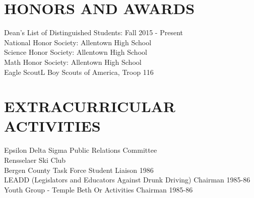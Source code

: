 \documentclass{res}
\begin{document}
\begin{resume}
 
 
\section{HONORS AND AWARDS}          
    Dean's List of Distinguished Students: Fall 2015 - Present  \\        
    National Honor Society: Allentown High School  \\        
    Science Honor Society: Allentown High School  \\       
    Math Honor Society: Allentown High School\\ 
    Eagle ScoutL Boy Scouts of America, Troop 116
 
\section{EXTRACURRICULAR ACTIVITIES}          
    Epsilon Delta Sigma Public Relations Committee \\         
    Rensselaer Ski Club     \\     
    Bergen County Task Force Student Liaison 1986  \\        
    LEADD (Legislators and Educators Against Drunk Driving) Chairman
     1985-86  \\        
    Youth Group - Temple Beth Or Activities Chairman 1985-86          
 
\end{resume}
\end{document}
